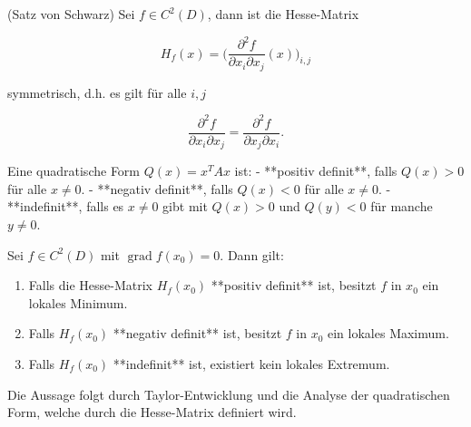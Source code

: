 \begin{satz}{}
(Satz von Schwarz)  
Sei $ f \in C^2(D) $, dann ist die Hesse-Matrix


$$
H_f(x) = \Bigg( \frac{\partial^2 f}{\partial x_i \partial x_j}(x) \Bigg)_{i,j}
$$


symmetrisch, d.h. es gilt für alle $ i,j $


$$
\frac{\partial^2 f}{\partial x_i \partial x_j} = \frac{\partial^2 f}{\partial x_j \partial x_i}.
$$


\end{satz}

\begin{definition}{}
Eine quadratische Form $ Q(x) = x^T A x $ ist:
- **positiv definit**, falls $ Q(x) > 0 $ für alle $ x \neq 0 $.
- **negativ definit**, falls $ Q(x) < 0 $ für alle $ x \neq 0 $.
- **indefinit**, falls es $ x \neq 0 $ gibt mit $ Q(x) > 0 $ und $ Q(y) < 0 $ für manche $ y \neq 0 $.
\end{definition}

\begin{satz}{}
Sei $ f \in C^2(D) $ mit $ \operatorname{grad} f(x_0) = 0 $. Dann gilt:
\begin{enumerate}
    \item Falls die Hesse-Matrix $ H_f(x_0) $ **positiv definit** ist, besitzt $ f $ in $ x_0 $ ein lokales Minimum.
    \item Falls $ H_f(x_0) $ **negativ definit** ist, besitzt $ f $ in $ x_0 $ ein lokales Maximum.
    \item Falls $ H_f(x_0) $ **indefinit** ist, existiert kein lokales Extremum.
\end{enumerate}
\end{satz}

\begin{beweisbox}
Die Aussage folgt durch Taylor-Entwicklung und die Analyse der quadratischen Form, welche durch die Hesse-Matrix definiert wird.  
\end{beweisbox}

